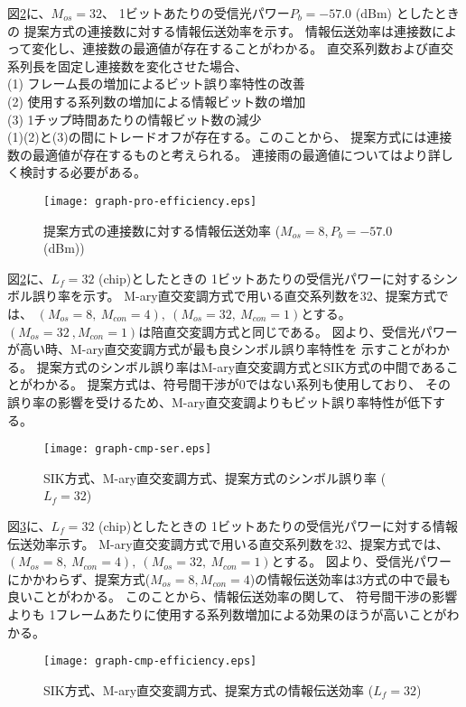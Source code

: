図\ref{fig:graph-cmp-ser}に、$M_{os}=32$、
1ビットあたりの受信光パワー$P_b=-57.0$ (dBm) としたときの
提案方式の連接数に対する情報伝送効率を示す。
情報伝送効率は連接数によって変化し、連接数の最適値が存在することがわかる。
直交系列数および直交系列長を固定し連接数を変化させた場合、\\
(1) フレーム長の増加によるビット誤り率特性の改善\\
(2) 使用する系列数の増加による情報ビット数の増加\\
(3) 1チップ時間あたりの情報ビット数の減少\\
(1)(2)と(3)の間にトレードオフが存在する。このことから、
提案方式には連接数の最適値が存在するものと考えられる。
連接雨の最適値についてはより詳しく検討する必要がある。
\begin{figure}[hpbt]
\begin{center}
  \texttt{[image: graph-pro-efficiency.eps]}
\caption{提案方式の連接数に対する情報伝送効率 
($M_{os} = 8, P_{b}=-57.0$ (dBm))}
\label{fig:graph-proposal-efficiency}
\end{center}
\end{figure}
%

図\ref{fig:graph-cmp-ser}に、$L_{f}=32$ (chip)としたときの
1ビットあたりの受信光パワーに対するシンボル誤り率を示す。
M-ary直交変調方式で用いる直交系列数を32、提案方式では、
$(M_{os}=8,~M_{con}=4),~(M_{os}=32,~M_{con}=1)$とする。
$(M_{os}=32~,M_{con}=1)$は陪直交変調方式と同じである。
図より、受信光パワーが高い時、M-ary直交変調方式が最も良シンボル誤り率特性を
示すことがわかる。
提案方式のシンボル誤り率はM-ary直交変調方式とSIK方式の中間であることがわかる。
提案方式は、符号間干渉が0ではない系列も使用しており、
その誤り率の影響を受けるため、M-ary直交変調よりもビット誤り率特性が低下する。
%
\begin{figure}[hpbt]
\begin{center}
  \texttt{[image: graph-cmp-ser.eps]}
\caption{SIK方式、M-ary直交変調方式、提案方式のシンボル誤り率
($L_{f} = 32$)}
\label{fig:graph-cmp-ser}
\end{center}
\end{figure}
%

図\ref{fig:graph-cmp-efficiency}に、$L_{f}=32$ (chip)としたときの
1ビットあたりの受信光パワーに対する情報伝送効率示す。
M-ary直交変調方式で用いる直交系列数を32、提案方式では、
$(M_{os}=8,~M_{con}=4),~(M_{os}=32,~M_{con}=1)$とする。
図より、受信光パワーにかかわらず、提案方式($M_{os}=8, M_{con}=4$)の情報伝送効率は3方式の中で最も
良いことがわかる。
このことから、情報伝送効率の関して、
符号間干渉の影響よりも
1フレームあたりに使用する系列数増加による効果のほうが高いことがわかる。
%
\begin{figure}[hpbt]
\begin{center}
  \texttt{[image: graph-cmp-efficiency.eps]}
\caption{SIK方式、M-ary直交変調方式、提案方式の情報伝送効率
($L_{f} = 32$)}
\label{fig:graph-cmp-efficiency}
\end{center}
\end{figure}
%
